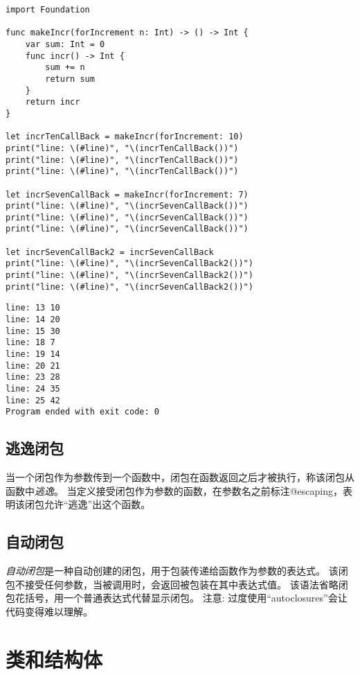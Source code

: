 \documentclass{../main.tex}{subfiles}
\begin{document}
\begin{lstlisting}[style = CodeLstStyleSwift, caption = {值捕获}]
import Foundation

func makeIncr(forIncrement n: Int) -> () -> Int {
    var sum: Int = 0
    func incr() -> Int {
        sum += n
        return sum
    }
    return incr
}

let incrTenCallBack = makeIncr(forIncrement: 10)
print("line: \(#line)", "\(incrTenCallBack())")
print("line: \(#line)", "\(incrTenCallBack())")
print("line: \(#line)", "\(incrTenCallBack())")

let incrSevenCallBack = makeIncr(forIncrement: 7)
print("line: \(#line)", "\(incrSevenCallBack())")
print("line: \(#line)", "\(incrSevenCallBack())")
print("line: \(#line)", "\(incrSevenCallBack())")

let incrSevenCallBack2 = incrSevenCallBack
print("line: \(#line)", "\(incrSevenCallBack2())")
print("line: \(#line)", "\(incrSevenCallBack2())")
print("line: \(#line)", "\(incrSevenCallBack2())")

\end{lstlisting}

\begin{lstlisting}[style = CodeLstStylePlainText, title = {运行结果}]
line: 13 10
line: 14 20
line: 15 30
line: 18 7
line: 19 14
line: 20 21
line: 23 28
line: 24 35
line: 25 42
Program ended with exit code: 0
\end{lstlisting}

\subsection{逃逸闭包}
当一个闭包作为参数传到一个函数中，闭包在函数返回之后才被执行，称该闭包从函数中\emph{逃逸}。
当定义接受闭包作为参数的函数，在参数名之前标注@escaping，表明该闭包允许``逃逸''出这个函数。

\subsection{自动闭包}
\emph{自动闭包}是一种自动创建的闭包，用于包装传递给函数作为参数的表达式。
该闭包不接受任何参数，当被调用时，会返回被包装在其中表达式值。
该语法省略闭包花括号，用一个普通表达式代替显示闭包。
注意: 过度使用``autoclosures''会让代码变得难以理解。

\section{类和结构体}


\end{document}
